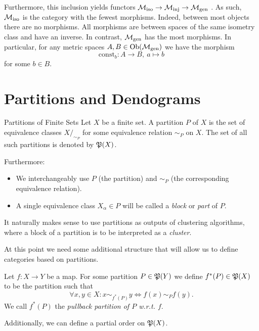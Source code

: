 Furthermore, this inclusion yields functors $\iso \to \inj \to \gen$ \cite[Def.~1.2.18]{Leinster2014-dc}.
As such, $\iso$ is the category with the fewest morphisms. Indeed, between most objects there are no morphisms.
All morphisms are between spaces of the same isometry class and have an inverse.
In contrast, $\gen$ has the most morphisms. In particular, for any metric spaces $A,B \in \ob(\gen)$ we have the morphism
$$
\mathrm{const}_b: A \to B, \ a \mapsto b
$$
for some $b \in B$.

\section{Partitions and Dendograms}
\label{section__partitions}

\begin{definition}{Partitions of Finite Sets}{}
Let $X$ be a finite set. A partition $P$ of $X$ is the set of equivalence classes $X/_{\sim_P}$ for some equivalence relation $\sim_P$ on $X$. The set of all such partitions is denoted by $\P(X)$.\par

\medskip Furthermore:
\begin{itemize}
    \item We interchangeably use $P$ (the partition) and $\sim_P$ (the corresponding equivalence relation).
    \item A single equivalence class $X_\alpha \in P$ will be called a \emph{block} or \emph{part} of $P$.
\end{itemize}
\end{definition}

It naturally makes sense to use partitions as outputs of clustering algorithms, where a block of a partition is to be interpreted as a \emph{cluster}.

At this point we need some additional structure that will allow us to define categories based on partitions.

\begin{definition}{}{}
Let $f: X \to Y$ be a map. For some partition $P \in \P(Y)$ we define $f^*(P) \in \P(X)$ to be the partition such that
\begin{equation*}
    \forall x,y \in X: x \sim_{f^*(P)} y \iff f(x) \sim_P f(y).
\end{equation*}
We call $f^*(P)$ the \emph{pullback partition of $P$ w.r.t. $f$}.
\end{definition}

Additionally, we can define a partial order on $\P(X)$.

